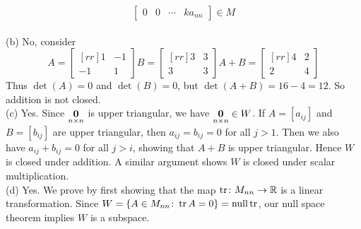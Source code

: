 \begin{solution}
$$\begin{bmatrix}
  0 & 0 & \cdots & ka_{nn} 
 \end{bmatrix}
 \in M
 $$
 \ \\
(b) No, consider
$$
A = 
\begin{bmatrix}[rr]
1&-1\\
-1&1
\end{bmatrix}
B =
\begin{bmatrix}[rr]
3&3\\
3&3
\end{bmatrix}
A+B = 
\begin{bmatrix}[rr]
4&2\\
2&4
\end{bmatrix}
$$
Thus $\det(A) = 0$ and $\det(B)=0$, but $\det(A+B) = 16 - 4 = 12$. So addition is not closed.
\\
(c) Yes. Since $\underset{n\times n}{{\mathbf 0}}$ is upper triangular, we have $\underset{n\times n}{{\mathbf 0}}\in W$. 
If $A=[a_{ij}]$ and $B=[b_{ij}]$ are upper triangular, then $a_{ij}=b_{ij}=0$ for all $j>1$. Then we also have $a_{ij}+b_{ij}=0$ for all $j>i$, showing that $A+B$ is upper triangular. Hence $W$ is closed under addition. A similar argument shows $W$ is closed under scalar multiplication. 
\\
(d) Yes. We prove by first showing that the map $\operatorname{tr}\colon M_{nn}\rightarrow {\mathbb R}$ is a linear transformation. Since $W=\{A\in M_{nn}\colon \operatorname{tr} A=0\}=\operatorname{null} \operatorname{tr}$, our null space theorem implies $W$ is a subspace. 


\end{solution}
